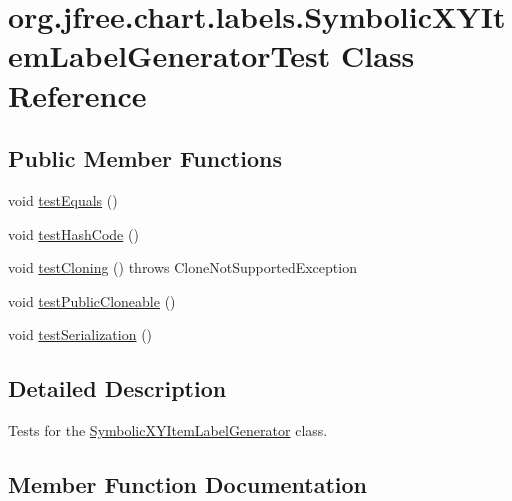 \hypertarget{classorg_1_1jfree_1_1chart_1_1labels_1_1_symbolic_x_y_item_label_generator_test}{}\section{org.\+jfree.\+chart.\+labels.\+Symbolic\+X\+Y\+Item\+Label\+Generator\+Test Class Reference}
\label{classorg_1_1jfree_1_1chart_1_1labels_1_1_symbolic_x_y_item_label_generator_test}
\subsection*{Public Member Functions}
\begin{DoxyCompactItemize}
\item 
void \mbox{\hyperlink{classorg_1_1jfree_1_1chart_1_1labels_1_1_symbolic_x_y_item_label_generator_test_a462bfef2588d2a83637a6751786bacf1}{test\+Equals}} ()
\item 
void \mbox{\hyperlink{classorg_1_1jfree_1_1chart_1_1labels_1_1_symbolic_x_y_item_label_generator_test_a55fc9743e11bc4e8ee6841c5c8be3655}{test\+Hash\+Code}} ()
\item 
void \mbox{\hyperlink{classorg_1_1jfree_1_1chart_1_1labels_1_1_symbolic_x_y_item_label_generator_test_ae00d9b9a530a8fc8c7c0e9943f1358ae}{test\+Cloning}} ()  throws Clone\+Not\+Supported\+Exception 
\item 
void \mbox{\hyperlink{classorg_1_1jfree_1_1chart_1_1labels_1_1_symbolic_x_y_item_label_generator_test_a1efabbfac6579aaa85ee814254ae7864}{test\+Public\+Cloneable}} ()
\item 
void \mbox{\hyperlink{classorg_1_1jfree_1_1chart_1_1labels_1_1_symbolic_x_y_item_label_generator_test_a6f3c2a79c6c7e838dc78ae6ebec39a12}{test\+Serialization}} ()
\end{DoxyCompactItemize}


\subsection{Detailed Description}
Tests for the \mbox{\hyperlink{classorg_1_1jfree_1_1chart_1_1labels_1_1_symbolic_x_y_item_label_generator}{Symbolic\+X\+Y\+Item\+Label\+Generator}} class. 

\subsection{Member Function Documentation}
\mbox{\label{classorg_1_1jfree_1_1chart_1_1labels_1_1_symbolic_x_y_item_label_generator_test_ae00d9b9a530a8fc8c7c0e9943f1358ae}} 

